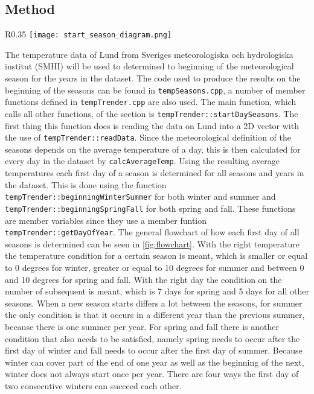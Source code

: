 \subsection{Method}

\begin{wrapfigure}{R}{0.35\textwidth}
\texttt{[image: start\_season\_diagram.png]}
\caption{The code used for the calculation of the start of a season represented in a flowchart.}
\label{fig:flowchart}
\end{wrapfigure}

The temperature data of Lund from Sveriges meteorologiska och hydrologiska institut (SMHI) will be used to determined to beginning of the meteorological season for the years in the dataset.  The code used to produce the results on the beginning of the seasons can be found in \texttt{tempSeasons.cpp}, a number of member functions defined in \texttt{tempTrender.cpp} are also used.  The main function, which calls all other functions, of the section is \texttt{tempTrender::startDaySeasons}.  The first thing this function does is reading the data on Lund into a 2D vector with the use of \texttt{tempTrender::readData}. Since the meteorological definition of the seasons depends on the average temperature of a day, this is then calculated for every day in the dataset by  \texttt{calcAverageTemp}. Using the resulting average temperatures each first day of a season is determined for all seasons and years in the dataset. This is done using the function \texttt{tempTrender::beginningWinterSummer} for both winter and summer and \texttt{tempTrender::beginningSpringFall} for both spring and fall. These functions are member variables since they use a member funtion \texttt{tempTrender::getDayOfYear}. The general flowchart of how each first day of all seasons is determined can be seen in \ref{fig:flowchart}. With the right temperature the temperature condition for a certain season is meant, which is smaller or equal to 0 degrees for winter, greater or equal to 10 degrees for summer and between 0 and 10 degrees for spring and fall. With the right day the condition on the number of subsequent is meant, which is 7 days for spring and 5 days for all other seasons. When a new season starts differs a lot between the seasons, for summer the only condition is that it occurs in a different year than the previous summer, because there is one summer per year. For spring and fall there is another condition that also needs to be satisfied, namely spring needs to occur after the first day of winter and fall needs to occur after the first day of summer. Because winter can cover part of the end of one year as well as the beginning of the next, winter does not always start once per year. There are four ways the first day of two consecutive winters can succeed each other. 

